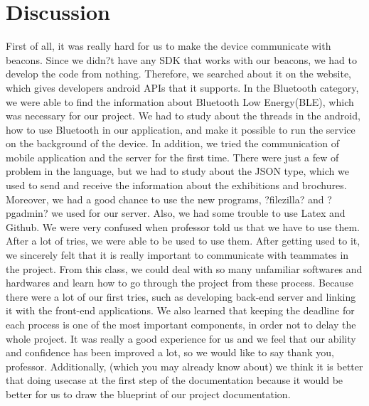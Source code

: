 \documentclass[conference]{IEEEtran}
\begin{document}
\section{Discussion}
\quad First of all, it was really hard for us to make the device communicate with beacons. Since we didn?t have any SDK that works with our beacons, we had to develop the code from nothing. Therefore, we searched about it on the website, which gives developers android APIs that it supports. In the Bluetooth category, we were able to find the information about Bluetooth Low Energy(BLE), which was necessary for our project. We had to study about the threads in the android, how to use Bluetooth in our application, and make it possible to run the service on the background of the device. In addition, we tried the communication of mobile application and the server for the first time. There were just a few of problem in the language, but we had to study about the JSON type, which we used to send and receive the information about the exhibitions and brochures. Moreover, we had a good chance to use the new programs, ?filezilla? and  ?pgadmin? we used for our server. Also, we had some trouble to use Latex and Github. We were very confused when professor told us that we have to use them. After a lot of tries, we were able to be used to use them. After getting used to it, we sincerely felt that it is really important to communicate with teammates in the project. From this class, we could deal with so many unfamiliar softwares and hardwares and learn how to go through the project from these process. Because there were a lot of our first tries, such as developing back-end server and linking it with the front-end applications. We also learned that keeping the deadline for each process is one of the most important components, in order not to delay the whole project. It was really a good experience for us and we feel that our ability and confidence has been improved a lot, so we would like to say thank you, professor. Additionally, (which you may already know about) we think it is better that doing usecase at the first step of the documentation because it would be better for us to draw the blueprint of our project documentation.
%
%
\end{document}
